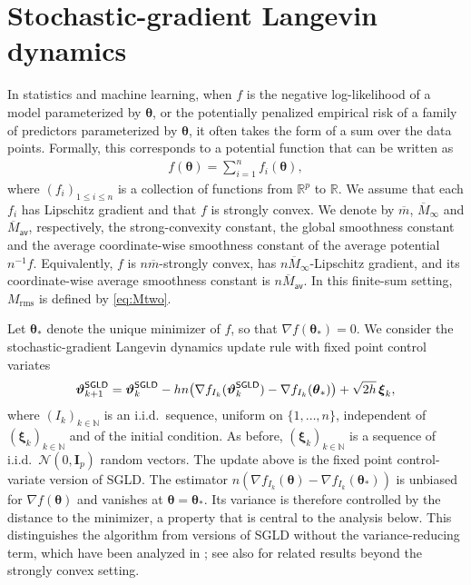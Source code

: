 \documentclass[aos,reqno]{imsart}
\newcommand\bxi{\boldsymbol\xi}
\newcommand\bfI{\mathbf I}
\newcommand\btheta{\boldsymbol\theta}
\newcommand\bvartheta{\boldsymbol\vartheta}
\def\Mtwo{M_{\mathrm{rms}}}
\def\mbar{\overline m}
\def\Mmaxbar{\overline M_{\infty}}
\def\Mavbar{\overline M_{\textsf{av}}}
\theoremstyle{definition}
\begin{document}
\section{Stochastic-gradient Langevin dynamics}
\label{Sec:SGLD}

In statistics and machine learning, when $f$ is the
negative log-likelihood of a model parameterized by
$\btheta$, or the potentially penalized empirical risk
of a family of predictors parameterized by $\btheta$,
it often takes the form of a sum over the data points.
Formally, this corresponds to a potential function that
can be written as
\begin{align}\label{eq:fsum}
    f(\btheta)=\sum_{i=1}^n f_i(\btheta),
\end{align}
where $(f_i)_{1\leqslant i\leqslant n}$ is a collection
of functions from $\mathbb R^p$ to $\mathbb R$. We assume
that each $f_i$ has Lipschitz gradient and that $f$ is
strongly convex. We denote by $\mbar$, $\Mmaxbar$ and $\Mavbar$,
respectively, the strong-convexity constant, the global
smoothness constant and the average coordinate-wise
smoothness constant of the average potential $n^{-1}f$.
Equivalently, $f$ is $n\mbar$-strongly convex, has
$n\Mmaxbar$-Lipschitz gradient, and its coordinate-wise
average smoothness constant is $n\Mavbar$. In this finite-sum
setting, $\Mtwo$ is defined by \eqref{eq:Mtwo}.

Let $\btheta_*$ denote the unique minimizer of $f$, so 
that $\nabla f(\btheta_*) = 0$. We consider the 
stochastic-gradient Langevin dynamics update rule with
fixed point control variates
\begin{align}
    \bvartheta_{k+1}^{\sf SGLD} =
    \bvartheta_k^{\sf SGLD} - hn\big(\nabla f_{I_k}
    (\bvartheta_k^{\sf SGLD}) - \nabla f_{I_k}
    (\btheta_*)\big) + \sqrt{2h}\,\bxi_k,
\end{align}
where $(I_k)_{k\in\mathbb N}$ is an i.i.d.\ sequence,
uniform on $\{1,\ldots,n\}$, independent of
$(\bxi_k)_{k\in\mathbb N}$ and of the initial 
condition. As before, $(\bxi_k)_{k\in\mathbb N}$ is a
sequence of i.i.d.\ $\mathcal N(0,\bfI_p)$ random
vectors. The update above is the fixed point control-variate
version of SGLD. The estimator $n(\nabla f_{I_k}
(\btheta) -\nabla f_{I_k}(\btheta_*))$
is unbiased for $\nabla f(\btheta)$ and vanishes at
$\btheta=\btheta_*$. Its variance is therefore controlled
by the distance to the minimizer, a property that is central
to the analysis below. This distinguishes the algorithm
from versions of SGLD without the variance-reducing term,
which have been analyzed in
\cite{dalalyan2019user,durmus2019analysis}; see also
\cite{cheng20e} for related results beyond the strongly
convex setting. 
\end{document}
